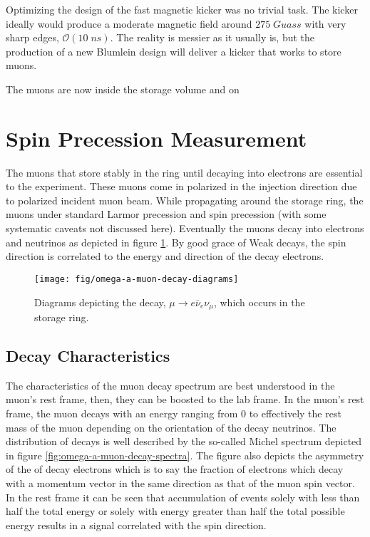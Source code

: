 Optimizing the design of the \gmtwo fast magnetic kicker was no trivial task.  The kicker ideally would produce a moderate magnetic field around $275\;Guass$ with very sharp edges, $\mathcal{O}(10\;ns)$. The reality is messier as it usually is, but the production of a new Blumlein  design will deliver a kicker that works to store muons.


The muons are now inside the storage volume and on 

\section{Spin Precession Measurement}

The muons that store stably in the ring until decaying into electrons are essential to the experiment.  These muons come in polarized in the injection direction due to polarized incident muon beam.  While propagating around the storage ring, the muons under standard Larmor precession and spin precession (with some systematic caveats not discussed here).  Eventually the muons decay into electrons and neutrinos as depicted in figure \ref{fig:omega-a-muon-decay-diagrams}.  By good grace of Weak decays, the spin direction is correlated to the energy and direction of the decay electrons.

\begin{figure}
\label{fig:omega-a-muon-decay-diagrams}
\texttt{[image: fig/omega-a-muon-decay-diagrams]}
\caption{Diagrams depicting the decay, $\mu \rightarrow e \bar{\nu}_e \nu_\mu$, which occurs in the \gmtwo storage ring.}
\end{figure}

\subsection{Decay Characteristics}

The characteristics of the muon decay spectrum are best understood in the muon's rest frame, then, they can be boosted to the lab frame.  In the muon's rest frame, the muon decays with an energy ranging from 0 to effectively the rest mass of the muon depending on the orientation of the decay neutrinos.  The distribution of decays is well described by the so-called Michel spectrum depicted in figure \ref{fig:omega-a-muon-decay-spectra}.  The figure also depicts the asymmetry of the of decay electrons which is to say the fraction of electrons which decay with a momentum vector in the same direction as that of the muon spin vector.  In the rest frame it can be seen that accumulation of events solely with less than half the total energy or solely with energy greater than half the total possible energy results in a signal correlated with the spin direction.

